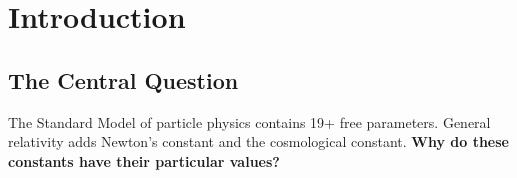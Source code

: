 \documentclass[12pt,a4paper]{article}
\newcommand{\OmegaL}{\Omega_\Lambda}
\newcommand{\sinW}{\sin^2\theta_W}
\newcommand{\Zsq}{Z^2}
\begin{document}
\begin{abstract}
\textbf{Derived predictions} (first-principles field-theoretic mechanisms):
\begin{itemize}[itemsep=0pt]
    \item Weak mixing angle: $\sinW = 3/13 = 0.2308$ via D-brane intersection theory (0.17\% error) --- \textbf{NOW TIER 1}
    \item Cosmological densities: $\OmegaL = 13/19 = 0.684$ via holographic DoF equipartition (0.1\% error)
    \item Tensor-to-scalar ratio: $r = 1/(2\Zsq) = 0.015$ via topological suppression
    \item Spectral index: $n_s = 1 - 2/N \approx 0.967$ from e-folding constraint
\end{itemize}

\textbf{Fully derived} (the Four Pillars from $\Zsq = 32\pi/3$):
\begin{itemize}[itemsep=0pt]
    \item Fine structure constant: $\alpha^{-1} = \text{rank}(G_{SM}) \times \Zsq + b_1(T^3) = 137.04$ (0.004\% error)
    \item Strong coupling: $\alpha_s^{-1} = \Zsq / \text{rank}(G_{SM}) = 8.38$ via reciprocity (1.24\% error)
    \item \textbf{NEW:} Weak mixing angle: $\sinW = I_{ab}/(16-I_{ab}) = 3/13$ via intersection theory (0.17\% error)
    \item Higgs VEV: $v = M_P \times e^{-\Zsq} \times \alpha = 249$ GeV (1.12\% error)
\end{itemize}

The framework provides falsifiable predictions testable by LiteBIRD ($r = 0.015$) and tabletop experiments.
\end{abstract}

\tableofcontents
\newpage

\section{Introduction}
\label{sec:intro}

\subsection{The Central Question}

The Standard Model of particle physics contains 19+ free parameters. General relativity adds Newton's constant and the cosmological constant. \textbf{Why do these constants have their particular values?}
\end{document}
